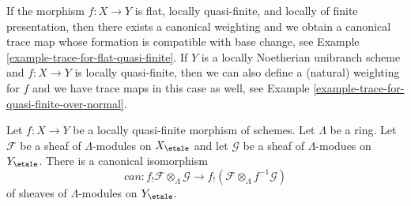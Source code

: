 \medskip\noindent
If the morphism $f : X \to Y$ is flat, locally quasi-finite, and locally of
finite presentation, then there exists a canonical weighting
and we obtain a canonical trace map whose formation is
compatible with base change, see
Example \ref{example-trace-for-flat-quasi-finite}.
If $Y$ is a locally Noetherian unibranch scheme and $f : X \to Y$
is locally quasi-finite, then we can also define a (natural)
weighting for $f$ and we have trace maps in this case as well, see
Example \ref{example-trace-for-quasi-finite-over-normal}.

\begin{lemma}
\label{lemma-f-shriek-projection}
Let $f : X \to Y$ be a locally quasi-finite morphism of schemes.
Let $\Lambda$ be a ring.
Let $\mathcal{F}$ be a sheaf of $\Lambda$-modules on $X_\etale$
and let $\mathcal{G}$ be a sheaf of $\Lambda$-modues on $Y_\etale$.
There is a canonical isomorphism
$$
can :
f_!\mathcal{F} \otimes_\Lambda \mathcal{G}
\longrightarrow
f_!(\mathcal{F} \otimes_\Lambda f^{-1}\mathcal{G})
$$
of sheaves of $\Lambda$-modules on $Y_\etale$.
\end{lemma}

